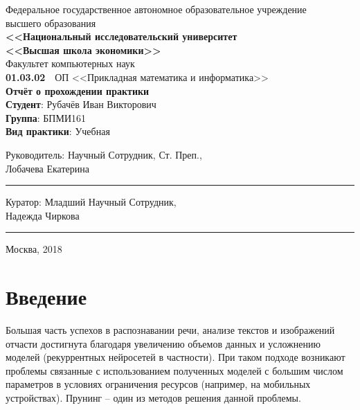 \documentclass[12pt]{article}
\begin{document}
\begin{titlepage}
  \center
  Федеральное государственное автономное образовательное учреждение\\
  высшего образования \\[.2cm]
  \textbf{\large <<Национальный исследовательский университет\\
    <<Высшая школа экономики>>}\\[.2cm]
  Факультет компьютерных наук\\[.2cm]
  \textbf{01.03.02}\ \  ОП <<Прикладная математика и информатика>>\\[4cm]
  \textbf{\LARGE Отчёт о прохождении практики}\\[2cm]
  {\flushleft
  \textbf{Студент}: Рубачёв Иван Викторович \\
  \textbf{Группа}: БПМИ161 \\
  \textbf{Вид практики}: Учебная\\[6cm]}

  \begin{multicols}{3}
    {\flushleft \scriptsize Руководитель:\vfill\columnbreak}
    {\flushleft \scriptsize Научный Сотрудник, Ст. Преп., \\[0.1em]}
    {\flushleft \scriptsize Лобачева Екатерина}
    {\vskip5mm\rule{5cm}{0.15mm}}
  \end{multicols}
  \begin{multicols}{3}
    {\flushleft \scriptsize Куратор:\vfill\columnbreak}
    {\flushleft \scriptsize Младший Научный Сотрудник, \\}
    {\flushleft \scriptsize Надежда Чиркова}
    {\vskip5mm\rule{5cm}{0.15mm}}
  \end{multicols}
  Москва, 2018
\end{titlepage}

{
\hypersetup{linkcolor=black}
\tableofcontents
}

\newpage

\section*{Введение}
%
Большая часть успехов в распознавании речи, анализе текстов и изображений отчасти достигнута благодаря
увеличению объемов данных и усложнению моделей (рекуррентных нейросетей в частности). При таком подходе
возникают проблемы связанные с использованием полученных моделей с большим числом параметров в условиях ограничения ресурсов
(например, на мобильных устройствах). Прунинг -- один из методов решения данной проблемы.
\end{document}
